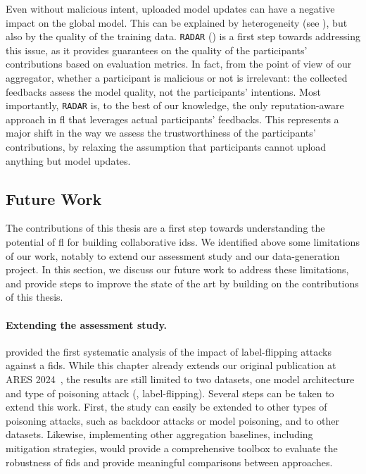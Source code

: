 \begin{itemize}[listparindent=\parindent,itemsep=.6\baselineskip]
  Even without malicious intent, uploaded model updates can have a negative impact on the global model.
  This can be explained by heterogeneity (see ), but also by the quality of the training data.
  \texttt{RADAR} () is a first step towards addressing this issue, as it provides guarantees on the quality of the participants' contributions based on evaluation metrics.
  In fact, from the point of view of our aggregator, whether a participant is malicious or not is irrelevant: the collected feedbacks assess the model quality, not the participants' intentions.
  Most importantly, \texttt{RADAR} is, to the best of our knowledge, the only reputation-aware approach in \gls{fl} that leverages actual participants' feedbacks.
  This represents a major shift in the way we assess the trustworthiness of the participants' contributions, by relaxing the assumption that participants cannot upload anything but model updates.

\end{itemize}


\subsection{Future Work\label{sec:conclusion.future}}

The contributions of this thesis are a first step towards understanding the potential of \gls{fl} for building collaborative \glspl{ids}.
We identified above some limitations of our work, notably to extend our assessment study and our data-generation project.
In this section, we discuss our future work to address these limitations, and provide steps to improve the state of the art by building on the contributions of this thesis.


\paragraph{Extending the assessment study.}

 provided the first systematic analysis of the impact of label-flipping attacks against a \gls{fids}.
While this chapter already extends our original publication at ARES 2024~\cite{lavaur_ares_bass_2024}, the results are still limited to two datasets, one model architecture and type of poisoning attack (\ie, label-flipping).
Several steps can be taken to extend this work.
First, the study can easily be extended to other types of poisoning attacks, such as backdoor attacks or model poisoning, and to other datasets.
Likewise, implementing other aggregation baselines, including mitigation strategies, would provide a comprehensive toolbox to evaluate the robustness of \gls{fids} and provide meaningful comparisons between approaches.



